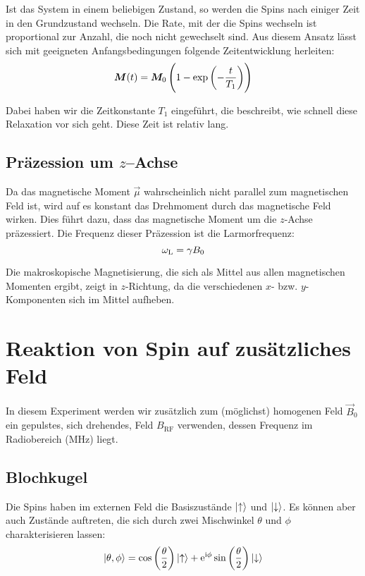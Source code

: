 Ist das System in einem beliebigen Zustand, so werden die Spins nach einiger
Zeit in den Grundzustand wechseln. Die Rate, mit der die Spins wechseln ist
proportional zur Anzahl, die noch nicht gewechselt sind. Aus diesem Ansatz
lässt sich mit geeigneten Anfangsbedingungen folgende Zeitentwicklung
herleiten: \parencite[Formel~P443.2]{physik412-Anleitung}
\begin{equation}
    \label{eq:M/exp}
    \vec M(t) = \vec M_0 \del{1 - \exp\del{- \frac{t}{T_1}}}
\end{equation}

Dabei haben wir die Zeitkonstante $T_1$ eingeführt, die beschreibt, wie schnell
diese Relaxation vor sich geht. Diese Zeit ist relativ lang.

\subsection{Präzession um $z$–Achse}
\label{subsec:Präzession}

Da das magnetische Moment $\vec\mu$ wahrscheinlich nicht parallel zum
magnetischen Feld ist, wird auf es konstant das Drehmoment durch das
magnetische Feld wirken. Dies führt dazu, dass das magnetische Moment um die
$z$-Achse präzessiert. Die Frequenz dieser Präzession ist die Larmorfrequenz:
\[
    \omega_\text L = \gamma B_0
\]

Die makroskopische Magnetisierung, die sich als Mittel aus allen
magnetischen Momenten ergibt, zeigt in $z$-Richtung, da die verschiedenen
$x$- bzw. $y$-Komponenten sich im Mittel aufheben.

\section{Reaktion von Spin auf zusätzliches Feld}

In diesem Experiment werden wir zusätzlich zum (möglichst) homogenen Feld $\vec
B_0$ ein gepulstes, sich drehendes, Feld $B_\text{RF}$ verwenden, dessen
Frequenz im Radiobereich (\si{\mega\hertz}) liegt.

\subsection{Blochkugel}

Die Spins haben im externen Feld die Basiszustände $\ket\uparrow$ und
$\ket\downarrow$. Es können aber auch Zustände auftreten, die sich durch zwei
Mischwinkel $\theta$ und $\phi$ charakterisieren lassen:
\parencite{wikipedia/bloch_kugel}
\[
    \ket{\theta, \phi}
    = \cos\del{\frac\theta2} \ket\uparrow
    + \eup^{\iup \phi} \sin\del{\frac\theta2} \ket\downarrow
\]

